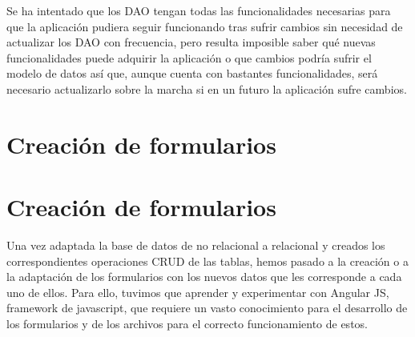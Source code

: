 \documentclass[11pt]{book}
\begin{document}
	Se ha intentado que los DAO tengan todas las funcionalidades necesarias para que la aplicación pudiera seguir funcionando tras sufrir cambios sin necesidad de actualizar los DAO con frecuencia, pero resulta imposible saber qué nuevas funcionalidades puede adquirir la aplicación o que cambios podría sufrir el modelo de datos así que, aunque cuenta con bastantes funcionalidades, será necesario actualizarlo sobre la marcha si en un futuro la aplicación sufre cambios.

\chapter{Creación de formularios}\label{cap:formularios}
\chapter{Creación de formularios}\label{cap:formularios}
Una vez adaptada la base de datos de no relacional a relacional y creados los correspondientes operaciones CRUD de las tablas, hemos pasado a la creación o a la adaptación de los formularios con los nuevos datos que les corresponde a cada uno de ellos. Para ello, tuvimos que aprender y experimentar con Angular JS, framework de javascript, que requiere un vasto conocimiento para el desarrollo de los formularios y de los archivos para el correcto funcionamiento de estos. 
\end{document}
